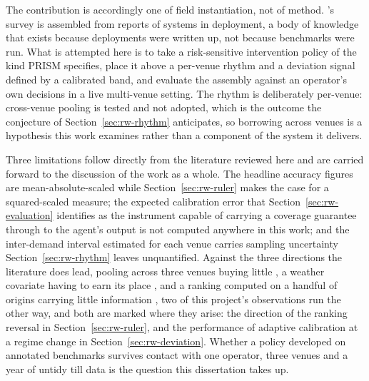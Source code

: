 The contribution is accordingly one of field instantiation, not of method.
\citet{paleyes_challenges_2022}'s survey is assembled from reports of systems in
deployment, a body of knowledge that exists because deployments were written up,
not because benchmarks were run. What is attempted here is to take a
risk-sensitive intervention policy of the kind PRISM specifies, place it above a
per-venue rhythm and a deviation signal defined by a calibrated band, and
evaluate the assembly against an operator's own decisions in a live multi-venue
setting. The rhythm is deliberately per-venue: cross-venue pooling is tested and
not adopted, which is the outcome the conjecture of
Section~\ref{sec:rw-rhythm} anticipates, so borrowing across venues is a
hypothesis this work examines rather than a component of the system it delivers.

Three limitations follow directly from the literature reviewed here and are
carried forward to the discussion of the work as a whole. The headline accuracy
figures are mean-absolute-scaled while Section~\ref{sec:rw-ruler} makes the case
for a squared-scaled measure; the expected calibration error that
Section~\ref{sec:rw-evaluation} identifies as the instrument capable of carrying
a coverage guarantee through to the agent's output is not computed anywhere in
this work; and the inter-demand interval estimated for each venue carries
sampling uncertainty Section~\ref{sec:rw-rhythm} leaves unquantified. Against the
three directions the literature does lead, pooling across three venues buying
little \citep{montero-manso_principles_2021}, a weather covariate having to earn
its place \citep{haben_short_2019,hertel_explainable_2026}, and a ranking
computed on a handful of origins carrying little information
\citep{hewamalage_look_2021,brigato_there_2025}, two of this project's
observations run the other way, and both are marked where they arise: the
direction of the ranking reversal in Section~\ref{sec:rw-ruler}, and the
performance of adaptive calibration at a regime change in
Section~\ref{sec:rw-deviation}. Whether a policy developed on annotated
benchmarks survives contact with one operator, three venues and a year of untidy
till data is the question this dissertation takes up.
